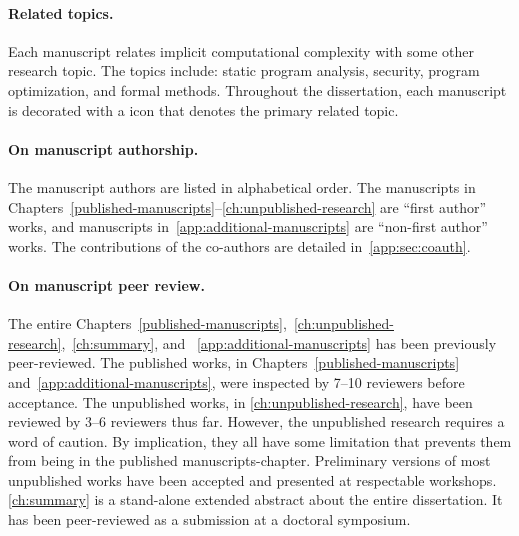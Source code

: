 \begin{description}
      
\end{description}

\paragraph*{Related topics.}
Each manuscript relates implicit computational complexity with some other research topic.
The topics include: static program analysis, security, program optimization, and formal methods.
Throughout the dissertation, each manuscript is decorated with a icon that denotes the primary related topic.

\paragraph*{On manuscript authorship.}
The manuscript authors are listed in alphabetical order.
The manuscripts in Chapters~\ref{published-manuscripts}--\ref{ch:unpublished-research} are \enquote{first author} works,
and manuscripts in~\autoref{app:additional-manuscripts} are \enquote{non-first author} works.
The contributions of the co-authors are detailed in~\autoref{app:sec:coauth}.

\paragraph*{On manuscript peer review.}
The entire Chapters~\ref{published-manuscripts},~\ref{ch:unpublished-research},~\ref{ch:summary}, and ~\ref{app:additional-manuscripts}
has been previously peer-reviewed.
The published works, in Chapters~\ref{published-manuscripts} and~\ref{app:additional-manuscripts}, were inspected by 7--10 reviewers before acceptance.
The unpublished works, in \autoref{ch:unpublished-research}, have been reviewed by 3--6 reviewers thus far.
However, the unpublished research requires a word of caution.
By implication, they all have some limitation that prevents them from being in the {published} manuscripts-chapter.
Preliminary versions of most unpublished works have been accepted and presented at respectable workshops.
\autoref{ch:summary} is a stand-alone extended abstract about the entire dissertation.
It has been peer-reviewed as a submission at a doctoral symposium.

